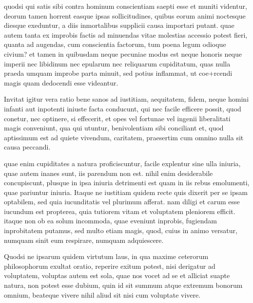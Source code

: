  quodsi qui satis sibi contra hominum conscientiam saepti esse et muniti videntur, deorum tamen horrent easque ipsas sollicitudines, quibus eorum animi noctesque diesque exeduntur, a diis inmortalibus supplicii causa importari putant. quae autem tanta ex improbis factis ad minuendas vitae molestias accessio potest fieri, quanta ad augendas, cum conscientia factorum, tum poena legum odioque civium? et tamen in quibusdam neque pecuniae modus est neque honoris neque imperii nec libidinum nec epularum nec reliquarum cupiditatum, quas nulla praeda umquam improbe parta minuit, sed potius inflammat, ut coe+rcendi magis quam dedocendi esse videantur.

 Invitat igitur vera ratio bene sanos ad iustitiam, aequitatem, fidem, neque homini infanti aut inpotenti iniuste facta conducunt, qui nec facile efficere possit, quod conetur, nec optinere, si effecerit, et opes vel fortunae vel ingenii liberalitati magis conveniunt, qua qui utuntur, benivolentiam sibi conciliant et, quod aptissimum est ad quiete vivendum, caritatem, praesertim cum omnino nulla sit causa peccandi.

 quae enim cupiditates a natura proficiscuntur, facile explentur sine ulla iniuria, quae autem inanes sunt, iis parendum non est. nihil enim desiderabile concupiscunt, plusque in ipsa iniuria detrimenti est quam in iis rebus emolumenti, quae pariuntur iniuria. Itaque ne iustitiam quidem recte quis dixerit per se ipsam optabilem, sed quia iucunditatis vel plurimum afferat. nam diligi et carum esse iucundum est propterea, quia tutiorem vitam et voluptatem pleniorem efficit. itaque non ob ea solum incommoda, quae eveniunt inprobis, fugiendam inprobitatem putamus, sed multo etiam magis, quod, cuius in animo versatur, numquam sinit eum respirare, numquam adquiescere.

 Quodsi ne ipsarum quidem virtutum laus, in qua maxime ceterorum philosophorum exultat oratio, reperire exitum potest, nisi derigatur ad voluptatem, voluptas autem est sola, quae nos vocet ad se et alliciat suapte natura, non potest esse dubium, quin id sit summum atque extremum bonorum omnium, beateque vivere nihil aliud sit nisi cum voluptate vivere.


